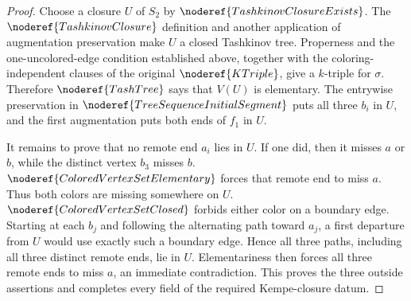\begin{proof}
Choose a closure \(U\) of \(S_2\) by
\(\noderef{TashkinovClosureExists}\).  The
\(\noderef{TashkinovClosure}\) definition and another
application of augmentation preservation make \(U\) a closed Tashkinov
tree.  Properness and the one-uncolored-edge condition established above,
together with the coloring-independent clauses of the original
\(\noderef{KTriple}\), give a \(k\)-triple for \(\sigma\).  Therefore
\(\noderef{TashTree}\) says that \(V(U)\) is elementary.  The entrywise
preservation in \(\noderef{TreeSequenceInitialSegment}\) puts all three
\(b_i\) in \(U\), and the first augmentation puts
both ends of \(f_1\) in \(U\).

It remains to prove that no remote end \(a_i\) lies in \(U\).  If one did,
then it misses \(a\) or \(b\), while the distinct vertex \(b_3\) misses
\(b\).  \(\noderef{ColoredVertexSetElementary}\) forces that remote end
to miss \(a\).  Thus both colors are missing somewhere on \(U\).
\(\noderef{ColoredVertexSetClosed}\) forbids either color
on a boundary edge.  Starting at each \(b_j\) and following the
alternating path toward \(a_j\), a first departure from \(U\) would use
exactly such a boundary edge.  Hence all three paths, including all three
distinct remote ends, lie in \(U\).  Elementariness then forces all three
remote ends to miss \(a\), an immediate contradiction.  This proves the
three outside assertions and completes every field of the required
Kempe-closure datum.
\end{proof}
